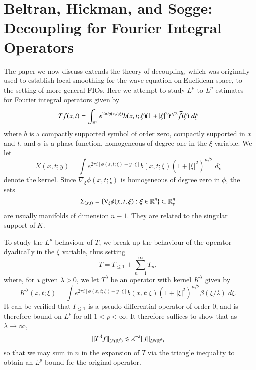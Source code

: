 \chapter[BHS: Decoupling for FIOs]{Beltran, Hickman, and Sogge: Decoupling for Fourier Integral Operators}

The paper we now discuss extends the theory of decoupling, which was originally used to establish local smoothing for the wave equation on Euclidean space, to the setting of more general FIOs. Here we attempt to study $L^p$ to $L^p$ estimates  for Fourier integral operators given by
%
\[ Tf(x,t) = \int_{\operatorname{\mathbb{R}}^d} e^{2 \pi i \phi(x,t;\xi)} b(x,t;\xi) (1 + |\xi|^2)^{\mu/2} \widehat{f}(\xi)\; d\xi \]
%
where $b$ is a compactly supported symbol of order zero, compactly supported in $x$ and $t$, and $\phi$ is a phase function, homogeneous of degree one in the $\xi$ variable. We let
%
\[ K(x,t;y) = \int e^{2 \pi i [\phi(x,t;\xi) - y \cdot \xi]} b(x,t;\xi) (1 + |\xi|^2)^{\mu/2}\; d\xi \]
%
denote the kernel. Since $\nabla_\xi \phi(x,t;\xi)$ is homogeneous of degree zero in $\phi$, the sets
%
\[ \Sigma_{(x,t)} = \{ \nabla_\xi \phi(x,t,\xi) : \xi \in \operatorname{\mathbb{R}}^n \} \subset \operatorname{\mathbb{R}}^n_y \]
%
are usually manifolds of dimension $n-1$. They are related to the singular support of $K$.


To study the $L^p$ behaviour of $T$, we break up the behaviour of the operator dyadically in the $\xi$ variable, thus setting
%
\[ T = T_{\leq 1} + \sum_{n = 1}^\infty T_n, \]
%
where, for a given $\lambda > 0$, we let $T^\lambda$ be an operator with kernel $K^\lambda$ given by
%
\[ K^\lambda(x,t;\xi) = \int e^{2 \pi i [\phi(x,t;\xi) - y \cdot \xi]} b(x,t;\xi) (1 + |\xi|^2)^{\mu/2} \beta(\xi / \lambda)\; d\xi. \]
%
It can be verified that $T_{\leq 1}$ is a pseudo-differential operator of order 0, and is therefore bound on $L^p$ for all $1 < p < \infty$. It therefore suffices to show that as $\lambda \to \infty$,
%
\[ \| T^\lambda f \|_{L^p(\operatorname{\mathbb{R}}^d)} \lesssim \lambda^{- \varepsilon} \| f \|_{L^p(\operatorname{\mathbb{R}}^d)} \]
%
so that we may sum in $n$ in the expansion of $T$ via the triangle inequality to obtain an $L^p$ bound for the original operator.

